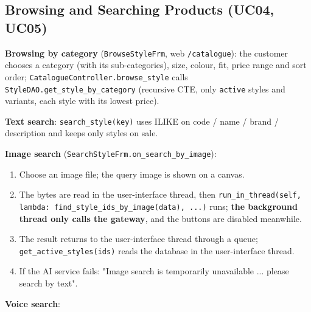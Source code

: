 \hypertarget{browsing-and-searching-products-uc04-uc05}{%
\subsection{Browsing and Searching Products (UC04,
UC05)}\label{browsing-and-searching-products-uc04-uc05}}

\textbf{Browsing by category} (\texttt{BrowseStyleFrm}, web
\texttt{/\allowbreak{}catalogue}): the customer chooses a category (with its
sub-categories), size, colour, fit, price range and sort order;
\texttt{CatalogueController.\allowbreak{}browse\_\allowbreak{}style} calls
\texttt{StyleDAO.\allowbreak{}get\_\allowbreak{}style\_\allowbreak{}by\_\allowbreak{}category} (recursive CTE, only
\texttt{active} styles and variants, each style with its lowest price).

\textbf{Text search}: \texttt{search\_\allowbreak{}style(\allowbreak{}key)} uses ILIKE on code /
name / brand / description and keeps only styles on sale.

\textbf{Image search} (\texttt{SearchStyleFrm.\allowbreak{}on\_\allowbreak{}search\_\allowbreak{}by\_\allowbreak{}image}):

\begin{enumerate}
\def\labelenumi{\arabic{enumi}.}
\tightlist
\item
  Choose an image file; the query image is shown on a canvas.
\item
  The bytes are read in the user-interface thread, then
  \texttt{run\_\allowbreak{}in\_\allowbreak{}thread(\allowbreak{}self,\allowbreak{} lambda: find\_\allowbreak{}style\_\allowbreak{}ids\_\allowbreak{}by\_\allowbreak{}image(\allowbreak{}data),\allowbreak{} .\allowbreak{}.\allowbreak{}.\allowbreak{})}
  runs; \textbf{the background thread only calls the gateway}, and the
  buttons are disabled meanwhile.
\item
  The result returns to the user-interface thread through a queue;
  \texttt{get\_\allowbreak{}active\_\allowbreak{}styles(\allowbreak{}ids)} reads the database in the
  user-interface thread.
\item
  If the AI service fails: "Image search is temporarily unavailable ...
  please search by text".
\end{enumerate}

\textbf{Voice search}:


